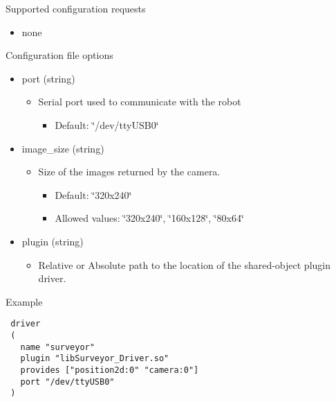 \begin{Desc}
\item[Supported configuration requests]\end{Desc}
\begin{itemize}
\item none\end{itemize}


\begin{Desc}
\item[Configuration file options]\end{Desc}
\begin{itemize}
\item port (string)\begin{itemize}
\item Serial port used to communicate with the robot\begin{itemize}
\item Default: \char`\"{}/dev/ttyUSB0\char`\"{}\end{itemize}
\end{itemize}
\item image\_\-size (string)\begin{itemize}
\item Size of the images returned by the camera.\begin{itemize}
\item Default: \char`\"{}320x240\char`\"{}\item Allowed values: \char`\"{}320x240\char`\"{}, \char`\"{}160x128\char`\"{}, \char`\"{}80x64\char`\"{}\end{itemize}
\end{itemize}
\item plugin (string)\begin{itemize}
\item Relative or Absolute path to the location of the shared-object plugin driver.\end{itemize}
\end{itemize}


\begin{Desc}
\item[Example]\end{Desc}


\footnotesize\begin{verbatim}
 driver
 (
   name "surveyor"
   plugin "libSurveyor_Driver.so"
   provides ["position2d:0" "camera:0"]
   port "/dev/ttyUSB0"
 )
 \end{verbatim}
\normalsize


